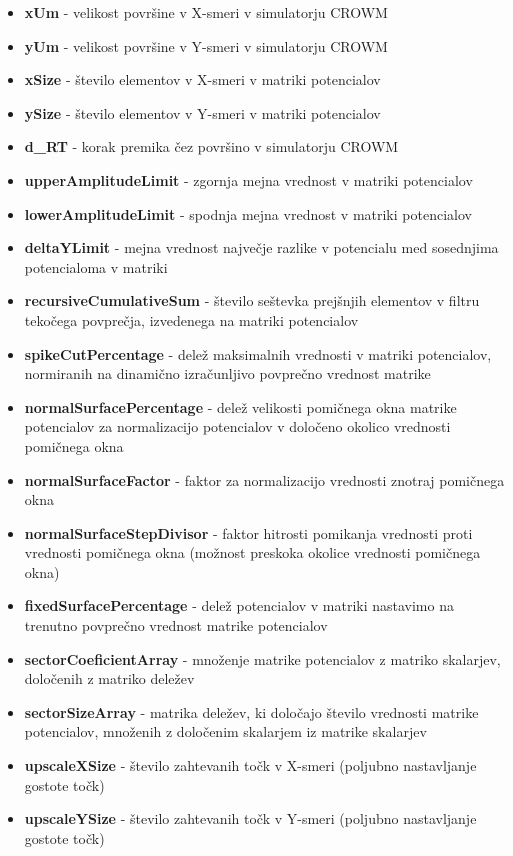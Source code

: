 \documentclass[a4paper,twoside,openright,12pt,slovene]{book}
\begin{document}
\begin{itemize}
    \setlength\itemsep{0.1em}
    \item \textbf{xUm} - velikost površine v X-smeri v simulatorju CROWM
    \item \textbf{yUm} - velikost površine v Y-smeri v simulatorju CROWM 
    \item \textbf{xSize} - število elementov v X-smeri v matriki potencialov
    \item \textbf{ySize} - število elementov v Y-smeri v matriki potencialov
    \item \textbf{d\_RT} - korak premika čez površino v simulatorju CROWM
    \item \textbf{upperAmplitudeLimit} - zgornja mejna vrednost v matriki potencialov
    \item \textbf{lowerAmplitudeLimit} - spodnja mejna vrednost v matriki potencialov
    \item \textbf{deltaYLimit}  - mejna vrednost največje razlike v potencialu med sosednjima potencialoma v matriki
    \item \textbf{recursiveCumulativeSum} - število seštevka prejšnjih elementov v filtru tekočega povprečja, izvedenega na matriki potencialov 
    \item \textbf{spikeCutPercentage} - delež maksimalnih vrednosti v matriki potencialov, normiranih na dinamično izračunljivo povprečno vrednost matrike
    \item \textbf{normalSurfacePercentage} - delež velikosti pomičnega okna matrike potencialov za normalizacijo potencialov v določeno okolico vrednosti pomičnega okna
    \item \textbf{normalSurfaceFactor} - faktor za normalizacijo vrednosti znotraj pomičnega okna
    \item \textbf{normalSurfaceStepDivisor} - faktor hitrosti pomikanja vrednosti proti vrednosti pomičnega okna (možnost preskoka okolice vrednosti pomičnega okna)
    \item \textbf{fixedSurfacePercentage} - delež potencialov v matriki nastavimo na trenutno povprečno vrednost matrike potencialov
    \item \textbf{sectorCoeficientArray} - množenje matrike potencialov z matriko skalarjev, določenih z matriko deležev
    \item \textbf{sectorSizeArray} - matrika deležev, ki določajo število vrednosti matrike potencialov, množenih z določenim skalarjem iz matrike skalarjev
    \item \textbf{upscaleXSize} - število zahtevanih točk v X-smeri (poljubno nastavljanje gostote točk)
    \item \textbf{upscaleYSize} - število zahtevanih točk v Y-smeri (poljubno nastavljanje gostote točk)
\end{itemize}
\end{document}
